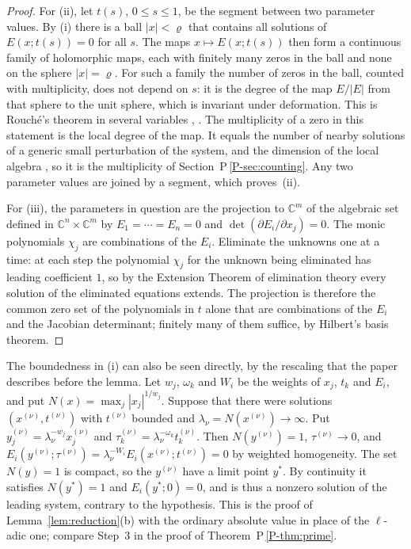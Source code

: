 \documentclass[11pt]{article}
\newcommand{\CC}{\mathbb C}
\numberwithin{equation}{section}
\begin{document}
\begin{proof}
For (ii), let \(t(s)\), \(0\le s\le1\), be the segment between two
parameter values. By (i) there is a ball \(|x|<\varrho\) that contains
all solutions of \(E(x;t(s))=0\) for all \(s\). The maps
\(x\mapsto E(x;t(s))\) then form a continuous family of holomorphic
maps, each with finitely many zeros in the ball and none on the sphere
\(|x|=\varrho\). For such a family the number of zeros in the ball,
counted with multiplicity, does not depend on \(s\): it is the degree
of the map \(E/|E|\) from that sphere to the unit sphere, which is
invariant under deformation. This is Rouch\'e's theorem in several
variables \citep[Appendix~B]{Milnor1968},
\citep[Sections~5.2 and~5.4]{ArnoldGuseinZadeVarchenko1985}. The
multiplicity of a zero in this statement is the local degree of the
map. It equals the number of nearby solutions of a generic small
perturbation of the system, and the dimension of the local algebra
\citep[Sections~5.2 and~5.4]{ArnoldGuseinZadeVarchenko1985}, so it is
the multiplicity of Section~P\,\ref{P-sec:counting}. Any two parameter
values are joined by a segment, which proves~(ii).

For (iii), the parameters in question are the projection to \(\CC^m\)
of the algebraic set defined in \(\CC^n\times\CC^m\) by
\(E_1=\cdots=E_n=0\) and \(\det(\partial E_i/\partial x_j)=0\). The
monic polynomials \(\chi_j\) are combinations of the \(E_i\). Eliminate
the unknowns one at a time: at each step the polynomial \(\chi_j\) for
the unknown being eliminated has leading coefficient \(1\), so by the
Extension Theorem of elimination theory
\citep[Chapter~3, \S1]{CoxLittleOSheaIVA} every solution of the
eliminated equations extends. The projection is therefore the common
zero set of the polynomials in \(t\) alone that are combinations of the
\(E_i\) and the Jacobian determinant; finitely many of them suffice, by
Hilbert's basis theorem.
\end{proof}

The boundedness in (i) can also be seen directly, by the rescaling
that the paper describes before the lemma. Let \(w_j\), \(\omega_k\) and
\(W_i\) be the weights of \(x_j\), \(t_k\) and \(E_i\), and put
\(N(x)=\max_j|x_j|^{1/w_j}\). Suppose that there were solutions
\((x^{(\nu)},t^{(\nu)})\) with \(t^{(\nu)}\) bounded and
\(\lambda_\nu=N(x^{(\nu)})\to\infty\). Put
\(y^{(\nu)}_j=\lambda_\nu^{-w_j}x^{(\nu)}_j\) and
\(\tau^{(\nu)}_k=\lambda_\nu^{-\omega_k}t^{(\nu)}_k\). Then
\(N(y^{(\nu)})=1\), \(\tau^{(\nu)}\to0\), and
\(E_i(y^{(\nu)};\tau^{(\nu)})
 =\lambda_\nu^{-W_i}E_i(x^{(\nu)};t^{(\nu)})=0\)
by weighted homogeneity. The set \(N(y)=1\) is compact, so the
\(y^{(\nu)}\) have a limit point \(y^\ast\). By continuity it satisfies
\(N(y^\ast)=1\) and \(E_i(y^\ast;0)=0\), and is thus a nonzero solution
of the leading system, contrary to the hypothesis. This is the proof of
Lemma~\ref{lem:reduction}(b) with the ordinary absolute value in place
of the \(\ell\)-adic one; compare Step~3 in the proof of
Theorem~P\,\ref{P-thm:prime}.
\end{document}
